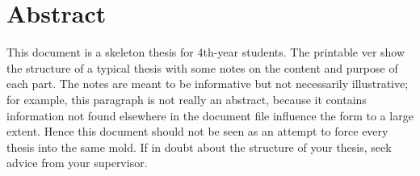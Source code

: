 \chapter{Abstract}

This document is a skeleton thesis for 4th-year students.  The
printable ver
show the structure of a typical thesis with some notes on the content
and purpose of each part.  The notes are meant to be informative but
not necessarily illustrative; for example, this paragraph is not
really an abstract, because it contains information not found
elsewhere in the document file
influence the form to a large
extent.  Hence this document should not be seen as an attempt to force
every thesis into the same mold.  If in doubt about the structure of
your thesis, seek advice from your supervisor.